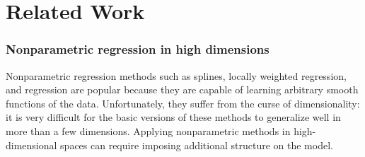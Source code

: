 








\section{Related Work}
\label{sec:related-work}

\def\rwsheader{\subsubsection}


\rwsheader{Nonparametric regression in high dimensions}
Nonparametric regression methods such as splines, locally weighted regression, and \gp{} regression are popular because they are capable of learning arbitrary smooth functions of the data.
Unfortunately, they suffer from the curse of dimensionality: it is very difficult for the basic versions of these methods to generalize well in more than a few dimensions.
Applying nonparametric methods in high-dimensional spaces can require imposing additional structure on the model.

